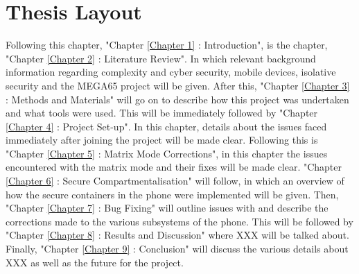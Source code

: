 \section{Thesis Layout}

\label{Ch1 Sec3}

Following this chapter, "Chapter \ref{Chapter 1} : Introduction", is the chapter, "Chapter \ref{Chapter 2} : Literature Review".
In which relevant background information regarding complexity and cyber security, mobile devices, isolative security and the MEGA65 project will be given.
After this, "Chapter \ref{Chapter 3} : Methods and Materials" will go on to describe how this project was undertaken and what tools were used.
This will be immediately followed by "Chapter \ref{Chapter 4} : Project Set-up".
In this chapter, details about the issues faced immediately after joining the project will be made clear.
Following this is "Chapter \ref{Chapter 5} : Matrix Mode Corrections", in this chapter the issues encountered with the matrix mode and their fixes will be made clear.
"Chapter \ref{Chapter 6} : Secure Compartmentalisation" will follow, in which an overview of how the secure containers in the phone were implemented will be given.
Then, "Chapter \ref{Chapter 7} : Bug Fixing" will outline issues with and describe the corrections made to the various subsystems of the phone.
This will be followed by "Chapter \ref{Chapter 8} : Results and Discussion" where XXX will be talked about.
Finally, "Chapter \ref{Chapter 9} : Conclusion" will discuss the various details about XXX as well as the future for the project.

